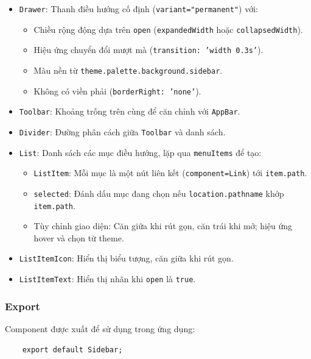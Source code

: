                 \begin{itemize}
                    \item \texttt{Drawer}: Thanh điều hướng cố định (\texttt{variant="permanent"}) với:
                    \begin{itemize}
                        \item Chiều rộng động dựa trên \texttt{open} (\texttt{expandedWidth} hoặc \texttt{collapsedWidth}).
                        \item Hiệu ứng chuyển đổi mượt mà (\texttt{transition: 'width 0.3s'}).
                        \item Màu nền từ \texttt{theme.palette.background.sidebar}.
                        \item Không có viền phải (\texttt{borderRight: 'none'}).
                    \end{itemize}
                    \item \texttt{Toolbar}: Khoảng trống trên cùng để căn chỉnh với \texttt{AppBar}.
                    \item \texttt{Divider}: Đường phân cách giữa \texttt{Toolbar} và danh sách.
                    \item \texttt{List}: Danh sách các mục điều hướng, lặp qua \texttt{menuItems} để tạo:
                    \begin{itemize}
                        \item \texttt{ListItem}: Mỗi mục là một nút liên kết (\texttt{component={Link}}) tới \texttt{item.path}.
                        \item \texttt{selected}: Đánh dấu mục đang chọn nếu \texttt{location.pathname} khớp \texttt{item.path}.
                        \item Tùy chỉnh giao diện: Căn giữa khi rút gọn, căn trái khi mở; hiệu ứng hover và chọn từ theme.
                    \end{itemize}
                    \item \texttt{ListItemIcon}: Hiển thị biểu tượng, căn giữa khi rút gọn.
                    \item \texttt{ListItemText}: Hiển thị nhãn khi \texttt{open} là \texttt{true}.
                \end{itemize}

            \subsubsection{Export}
                \hspace*{0.6cm}Component được xuất để sử dụng trong ứng dụng:
                \begin{lstlisting}
    export default Sidebar;
                \end{lstlisting}

